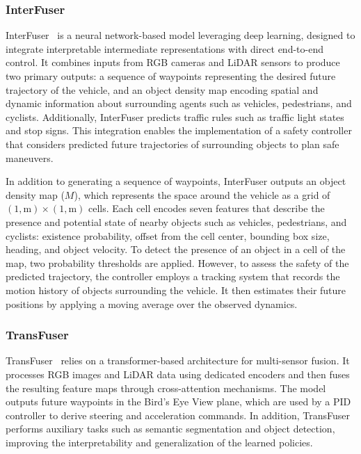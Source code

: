 \subsubsection{InterFuser}
InterFuser~\cite{shao2022safetyenhancedautonomousdrivingusing} is a neural network-based model leveraging deep learning, designed to integrate interpretable intermediate representations with direct end-to-end control. It combines inputs from RGB cameras and LiDAR sensors to produce two primary outputs: a sequence of waypoints representing the desired future trajectory of the vehicle, and an object density map encoding spatial and dynamic information about surrounding agents such as vehicles, pedestrians, and cyclists. Additionally, InterFuser predicts traffic rules such as traffic light states and stop signs. This integration enables the implementation of a safety controller that considers predicted future trajectories of surrounding objects to plan safe maneuvers.

In addition to generating a sequence of waypoints, InterFuser outputs an object density map ($M$), which represents the space around the vehicle as a grid of $(1,\text{m}) \times (1,\text{m})$ cells. Each cell encodes seven features that describe the presence and potential state of nearby objects such as vehicles, pedestrians, and cyclists: existence probability, offset from the cell center, bounding box size, heading, and object velocity. To detect the presence of an object in a cell of the map, two probability thresholds are applied. However, to assess the safety of the predicted trajectory, the controller employs a tracking system that records the motion history of objects surrounding the vehicle. It then estimates their future positions by applying a moving average over the observed dynamics.

\subsubsection{TransFuser}
TransFuser~\cite{chitta2022transfuserimitationtransformerbasedsensor} relies on a transformer-based architecture for multi-sensor fusion. It processes RGB images and LiDAR data using dedicated encoders and then fuses the resulting feature maps through cross-attention mechanisms. The model outputs future waypoints in the Bird’s Eye View plane, which are used by a PID controller to derive steering and acceleration commands. In addition, TransFuser performs auxiliary tasks such as semantic segmentation and object detection, improving the interpretability and generalization of the learned policies.

